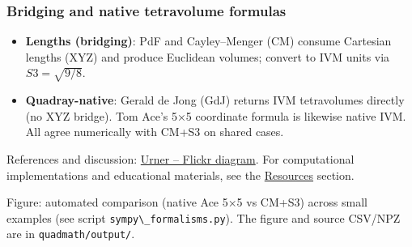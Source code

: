 \documentclass[
  10pt,
]{article}
\newcommand{\passthrough}[1]{#1}
\providecommand{\tightlist}{%
  \setlength{\itemsep}{0pt}\setlength{\parskip}{0pt}}
\begin{document}
\subsubsection{Bridging and native tetravolume
formulas}\label{bridging-and-native-tetravolume-formulas}

\begin{itemize}
\tightlist
\item
  \textbf{Lengths (bridging)}: PdF and Cayley--Menger (CM) consume
  Cartesian lengths (XYZ) and produce Euclidean volumes; convert to IVM
  units via \(S3 = \sqrt{9/8}\).
\item
  \textbf{Quadray-native}: Gerald de Jong (GdJ) returns IVM tetravolumes
  directly (no XYZ bridge). Tom Ace's 5×5 coordinate formula is likewise
  native IVM. All agree numerically with CM+S3 on shared cases.
\end{itemize}

References and discussion: \href{https://flic.kr/p/2rn22en}{Urner --
Flickr diagram}. For computational implementations and educational
materials, see the \href{07_resources.md}{Resources} section.

Figure: automated comparison (native Ace 5×5 vs CM+S3) across small
examples (see script \passthrough{\lstinline!sympy\_formalisms.py!}).
The figure and source CSV/NPZ are in
\passthrough{\lstinline!quadmath/output/!}.
\end{document}
